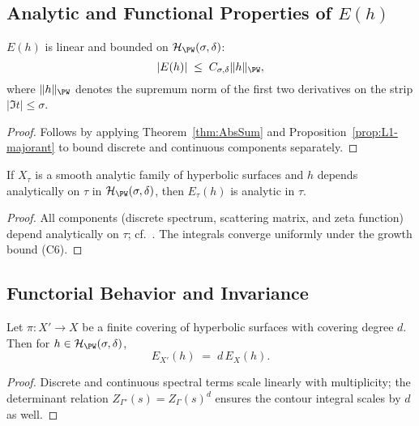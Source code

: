 \subsection{Analytic and Functional Properties of \(E(h)\)} \label{subsec:analytic-properties-Eh} %

\begin{proposition} \label{prop:Eh-linear-bounded} %
\(E(h)\) is linear and bounded on \(\mathcal H_{\PW}(\sigma,\delta)\):
\[
  |E(h)| \;\le\; C_{\sigma,\delta} \|h\|_{\PW},
\]
where \(\|h\|_{\PW}\) denotes the supremum norm of the first two derivatives on the strip \(|\Im t|\le\sigma\). %
\end{proposition}

\begin{proof}
Follows by applying Theorem~\ref{thm:AbsSum} and Proposition~\ref{prop:L1-majorant} to bound discrete and continuous components separately. %
\end{proof}

\begin{proposition} \label{prop:Eh-analytic} %
If \(X_\tau\) is a smooth analytic family of hyperbolic surfaces and \(h\) depends analytically on \(\tau\) in \(\mathcal H_{\PW}(\sigma,\delta)\), then \(E_\tau(h)\) is analytic in \(\tau\). %
\end{proposition}

\begin{proof}
All components (discrete spectrum, scattering matrix, and zeta function) depend analytically on \(\tau\); cf.\ \cite{HejhalII, Borthwick}. The integrals converge uniformly under the growth bound (C6). %
\end{proof}

\subsection{Functorial Behavior and Invariance} \label{subsec:functorial-invariance-Eh} %

\begin{proposition} \label{prop:covering-invariance} %
Let \(\pi:X'\to X\) be a finite covering of hyperbolic surfaces with covering degree \(d\). Then for \(h\in\mathcal H_{\PW}(\sigma,\delta)\),
\[
  E_{X'}(h) \;=\; d\,E_X(h).
\]
\end{proposition}

\begin{proof}
Discrete and continuous spectral terms scale linearly with multiplicity; the determinant relation \(Z_{\Gamma'}(s)=Z_\Gamma(s)^d\) ensures the contour integral scales by \(d\) as well. %
\end{proof}


